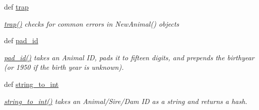 \begin{DoxyCompactItemize}
def \hyperlink{classPyPedal_1_1pyp__newclasses_1_1NewAnimal_a7e0f99289cd0d36e391d3f0655bbd694}{trap}
\begin{DoxyCompactList}\small\item\em \hyperlink{classPyPedal_1_1pyp__newclasses_1_1NewAnimal_a7e0f99289cd0d36e391d3f0655bbd694}{trap()} checks for common errors in NewAnimal() objects \end{DoxyCompactList}\item 
def \hyperlink{classPyPedal_1_1pyp__newclasses_1_1NewAnimal_afc05804f6dd528ab5bf0b8a39e543ce9}{pad\_\-id}
\begin{DoxyCompactList}\small\item\em \hyperlink{classPyPedal_1_1pyp__newclasses_1_1NewAnimal_afc05804f6dd528ab5bf0b8a39e543ce9}{pad\_\-id()} takes an Animal ID, pads it to fifteen digits, and prepends the birthyear (or 1950 if the birth year is unknown). \end{DoxyCompactList}\item 
def \hyperlink{classPyPedal_1_1pyp__newclasses_1_1NewAnimal_a1ca64b46fb81306492bf8a93a46f3ace}{string\_\-to\_\-int}
\begin{DoxyCompactList}\small\item\em \hyperlink{classPyPedal_1_1pyp__newclasses_1_1NewAnimal_a1ca64b46fb81306492bf8a93a46f3ace}{string\_\-to\_\-int()} takes an Animal/Sire/Dam ID as a string and returns a hash. \end{DoxyCompactList}\end{DoxyCompactItemize}
